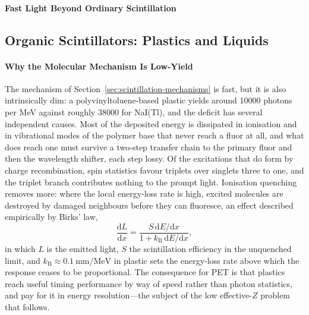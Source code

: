 \paragraph{Fast Light Beyond Ordinary Scintillation}

\subsection{Organic Scintillators: Plastics and Liquids}
\label{sec:organic}

\paragraph{Why the Molecular Mechanism Is Low-Yield}
The mechanism of Section~\ref{sec:scintillation-mechanisms} is fast, but it is also intrinsically dim: a polyvinyltoluene-based plastic yields around \num{10000} photons per \unit{\mega\electronvolt} against roughly \num{38000} for NaI(Tl), and the deficit has several independent causes.
Most of the deposited energy is dissipated in ionisation and in vibrational modes of the polymer base that never reach a fluor at all, and what does reach one must survive a two-step transfer chain to the primary fluor and then the wavelength shifter, each step lossy.
Of the excitations that do form by charge recombination, spin statistics favour triplets over singlets three to one, and the triplet branch contributes nothing to the prompt light.
Ionisation quenching removes more: where the local energy-loss rate is high, excited molecules are destroyed by damaged neighbours before they can fluoresce, an effect described empirically by Birks' law,
\begin{equation}
	\frac{\mathrm{d}L}{\mathrm{d}x} = \frac{S \, \mathrm{d}E/\mathrm{d}x}{1 + k_\mathrm{B} \, \mathrm{d}E/\mathrm{d}x},
	\label{eq:birks}
\end{equation}
in which $L$ is the emitted light, $S$ the scintillation efficiency in the unquenched limit, and $k_\mathrm{B} \approx \qty{0.1}{\milli\metre\per\mega\electronvolt}$ in plastic sets the energy-loss rate above which the response ceases to be proportional.
The consequence for PET is that plastics reach useful timing performance by way of speed rather than photon statistics, and pay for it in energy resolution---the subject of the low effective-$Z$ problem that follows.

